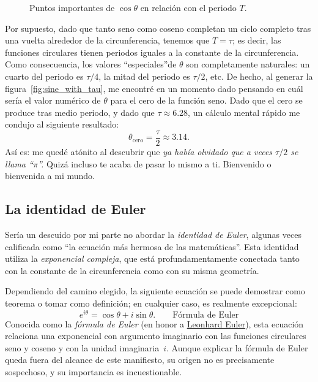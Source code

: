 \begin{figure}
\begin{center}
\end{center}
\caption{Puntos importantes de $\cos\theta$ en relación con el periodo $T$.\label{fig:cosine_with_tau}}
\end{figure}


Por supuesto, dado que tanto seno como coseno completan un ciclo completo tras una vuelta alrededor de la circunferencia, tenemos que $T = \tau$; es decir, las funciones circulares tienen periodos iguales a la constante de la circunferencia. Como consecuencia, los valores ``especiales''de $\theta$ son completamente naturales: un cuarto del periodo es $\tau/4$, la mitad del periodo es $\tau/2$, etc. De hecho, al generar la figura~\ref{fig:sine_with_tau}, me encontré en un momento dado pensando en cuál sería el valor numérico de $\theta$ para el cero de la función seno. Dado que el cero se produce tras medio periodo, y dado que $\tau \approx 6.28$, un cálculo mental rápido me condujo al siguiente resultado:
\[
  \theta_\mathrm{cero} = \frac{\tau}{2} \approx 3.14.
\]
Así es: me quedé atónito al descubrir que \emph{ya había olvidado que a veces $\tau/2$ se llama ``$\pi$''.} Quizá incluso te acaba de pasar lo mismo a ti. Bienvenido o bienvenida a mi mundo.



   \subsection{La identidad de Euler} %
   \label{sec:euler_s_identity}

Sería un descuido por mi parte no abordar la \emph{identidad de Euler}, algunas veces calificada como ``la ecuación más hermosa de las matemáticas''. Esta identidad utiliza la \emph{exponencial compleja}, que está profundamentamente conectada tanto con la constante de la circunferencia como con su misma geometría.

Dependiendo del camino elegido, la siguiente ecuación se puede demostrar como teorema o tomar como definición; en cualquier caso, es realmente excepcional:
\begin{equation}
\label{eq:eulers_formula}
e^{i\theta} = \cos\theta + i\sin\theta. \qquad\mbox{Fórmula de Euler}
\end{equation}
Conocida como la \emph{fórmula de Euler} (en honor a \href{https://es.wikipedia.org/wiki/Leonhard_Euler}{Leonhard Euler}), esta ecuación relaciona una exponencial con argumento imaginario con las funciones circulares seno y coseno y con la unidad imaginaria~$i$. Aunque explicar la fórmula de Euler queda fuera del alcance de este manifiesto, su origen no es precisamente sospechoso, y su importancia es incuestionable.


